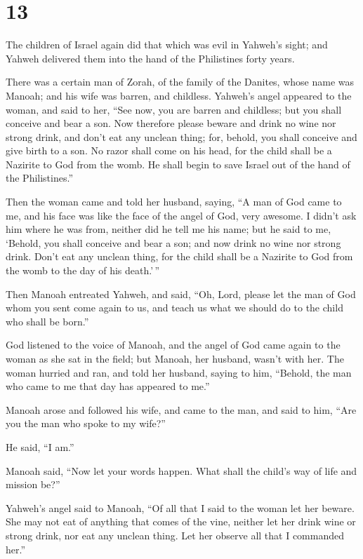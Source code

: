 \hypertarget{section-12}{%
\section{13}\label{section-12}}

 The children of Israel again did that which was evil in
Yahweh's sight; and Yahweh delivered them into the hand of the
Philistines forty years.

 There was a certain man of Zorah, of the family of the
Danites, whose name was Manoah; and his wife was barren, and childless.
 Yahweh's angel appeared to the woman, and said to her,
``See now, you are barren and childless; but you shall conceive and bear
a son.  Now therefore please beware and drink no wine nor
strong drink, and don't eat any unclean thing;  for,
behold, you shall conceive and give birth to a son. No razor shall come
on his head, for the child shall be a Nazirite to God from the womb. He
shall begin to save Israel out of the hand of the Philistines.''

 Then the woman came and told her husband, saying, ``A man
of God came to me, and his face was like the face of the angel of God,
very awesome. I didn't ask him where he was from, neither did he tell me
his name;  but he said to me, `Behold, you shall conceive
and bear a son; and now drink no wine nor strong drink. Don't eat any
unclean thing, for the child shall be a Nazirite to God from the womb to
the day of his death.'\,''

 Then Manoah entreated Yahweh, and said, ``Oh, Lord,
please let the man of God whom you sent come again to us, and teach us
what we should do to the child who shall be born.''

 God listened to the voice of Manoah, and the angel of God
came again to the woman as she sat in the field; but Manoah, her
husband, wasn't with her.  The woman hurried and ran, and
told her husband, saying to him, ``Behold, the man who came to me that
day has appeared to me.''

 Manoah arose and followed his wife, and came to the man,
and said to him, ``Are you the man who spoke to my wife?''

He said, ``I am.''

 Manoah said, ``Now let your words happen. What shall the
child's way of life and mission be?''

 Yahweh's angel said to Manoah, ``Of all that I said to
the woman let her beware.  She may not eat of anything
that comes of the vine, neither let her drink wine or strong drink, nor
eat any unclean thing. Let her observe all that I commanded her.''


